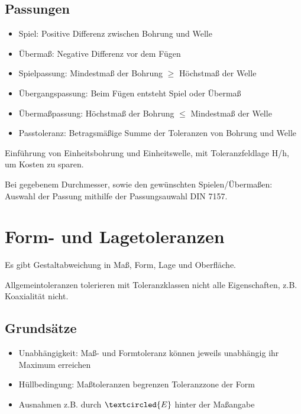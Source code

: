 \documentclass[a4paper,parskip=half*,DIV=7,fontsize=11pt]{scrartcl}
\begin{document}
\subsection{Passungen}
\begin{itemize}
	\item Spiel: Positive Differenz zwischen Bohrung und Welle
	\item Übermaß: Negative Differenz vor dem Fügen
	\item Spielpassung: Mindestmaß der Bohrung $\geq$ Höchstmaß der Welle
	\item Übergangspassung: Beim Fügen entsteht Spiel oder Übermaß
	\item Übermaßpassung: Höchstmaß der Bohrung $\leq$ Mindestmaß der Welle
	\item Passtoleranz: Betragsmäßige Summe der Toleranzen von Bohrung und Welle
\end{itemize}
Einführung von Einheitsbohrung und Einheitswelle, mit Toleranzfeldlage H/h, um Kosten zu sparen. 
	
Bei gegebenem Durchmesser, sowie den gewünschten Spielen/Übermaßen: Auswahl der Passung mithilfe der Passungsauwahl DIN 7157.
	
\section{Form- und Lagetoleranzen}
Es gibt Gestaltabweichung in Maß, Form, Lage und Oberfläche.
	
Allgemeintoleranzen tolerieren mit Toleranzklassen nicht alle Eigenschaften, z.B. Koaxialität nicht.
\subsection{Grundsätze}
\begin{itemize}
	\item Unabhängigkeit: Maß- und Formtoleranz können jeweils unabhängig ihr Maximum erreichen
	\item Hüllbedingung: Maßtoleranzen begrenzen Toleranzzone der Form
	\item Ausnahmen z.B. durch $\textcircled{\tiny E}$ hinter der Maßangabe
\end{itemize}
	
\end{document}

